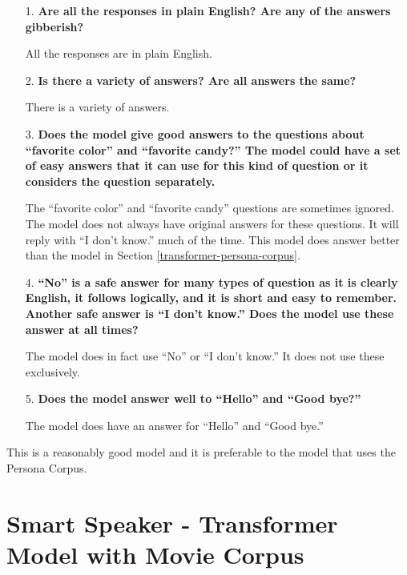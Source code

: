 \begin{itemize}
	\item [1.] \textbf{Are all the responses in plain English? Are any of the answers gibberish?}
	
	\item []All the responses are in plain English. 
	
	\item [2.] \textbf{Is there a  variety of answers? Are all answers the same?}
	
	\item []There is a variety of answers. 
	
	\item [3.] \textbf{Does the model give good answers to the questions about ``favorite color'' and ``favorite candy?'' The model could have a set of easy answers that it can use for this kind of question or it considers the question separately. }
	
	\item []The ``favorite color'' and ``favorite candy'' questions are sometimes ignored. The model does not always have original answers for these questions. It will reply with ``I don't know.'' much of the time. This model does answer better than the model in Section \ref{transformer-persona-corpus}.
	
	\item [4.] \textbf{``No'' is a safe answer for many types of question as it is clearly English, it follows logically, and it is short and easy to remember. Another safe answer is ``I don't know.'' Does the model use these answer at all times?}
	
	\item []The model does in fact use ``No'' or ``I don't know.'' It does not use these exclusively.
	
	\item [5.] \textbf{Does the model answer well to ``Hello'' and ``Good bye?''}
	
	\item []The model does have an answer for ``Hello'' and ``Good bye.''
\end{itemize}

This is a reasonably good model and it is preferable to the model that uses the Persona Corpus.

\section{Smart Speaker - Transformer Model with Movie Corpus}

